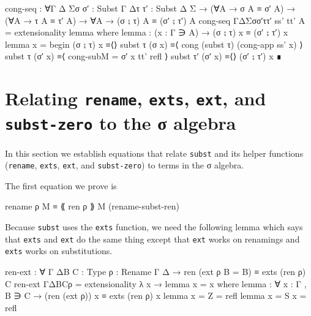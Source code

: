 \begin{fence}
\begin{code}
cong-seq : ∀{Γ Δ Σ}{σ σ′ : Subst Γ Δ}{τ τ′ : Subst Δ Σ}
  → (∀{A} → σ {A} ≡ σ′ {A}) → (∀{A} → τ {A} ≡ τ′ {A})
  → ∀{A} → (σ ⨟ τ) {A} ≡ (σ′ ⨟ τ′) {A}
cong-seq {Γ}{Δ}{Σ}{σ}{σ′}{τ}{τ′} ss' tt' {A} = extensionality lemma
  where
  lemma : (x : Γ ∋ A) → (σ ⨟ τ) x ≡ (σ′ ⨟ τ′) x
  lemma x =
     begin
       (σ ⨟ τ) x
     ≡⟨⟩
       subst τ (σ x)
     ≡⟨ cong (subst τ) (cong-app ss' x) ⟩
       subst τ (σ′ x)
     ≡⟨ cong-sub{M = σ′ x} tt' refl ⟩
       subst τ′ (σ′ x)
     ≡⟨⟩
       (σ′ ⨟ τ′) x
     ∎
\end{code}
\end{fence}

\hypertarget{relating-rename-exts-ext-and-subst-zero-to-the-ux3c3-algebra}{%
\section{\texorpdfstring{Relating \texttt{rename}, \texttt{exts},
\texttt{ext}, and \texttt{subst-zero} to the σ
algebra}{Relating rename, exts, ext, and subst-zero to the σ algebra}}\label{relating-rename-exts-ext-and-subst-zero-to-the-ux3c3-algebra}}

In this section we establish equations that relate \texttt{subst} and
its helper functions (\texttt{rename}, \texttt{exts}, \texttt{ext}, and
\texttt{subst-zero}) to terms in the σ algebra.

The first equation we prove is

\begin{myDisplay}
rename ρ M ≡ ⟪ ren ρ ⟫ M              (rename-subst-ren)
\end{myDisplay}

Because \texttt{subst} uses the \texttt{exts} function, we need the
following lemma which says that \texttt{exts} and \texttt{ext} do the
same thing except that \texttt{ext} works on renamings and \texttt{exts}
works on substitutions.

\begin{fence}
\begin{code}
ren-ext : ∀ {Γ Δ}{B C : Type} {ρ : Rename Γ Δ}
        → ren (ext ρ {B = B}) ≡ exts (ren ρ) {C}
ren-ext {Γ}{Δ}{B}{C}{ρ} = extensionality λ x → lemma {x = x}
  where
  lemma : ∀ {x : Γ , B ∋ C} → (ren (ext ρ)) x ≡ exts (ren ρ) x
  lemma {x = Z} = refl
  lemma {x = S x} = refl
\end{code}
\end{fence}

